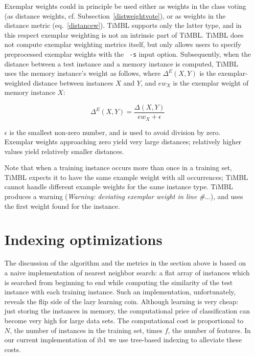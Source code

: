 \documentclass{report}
\begin{document}
Exemplar weights could in principle be used either as weights in the
class voting (as distance weights,
cf. Subsection~\ref{distweightvote}), or as weights in the distance
metric (eq.~\ref{distancew}). TiMBL supports only the latter type, and
in this respect exemplar weighting is not an intrinsic part of
TiMBL. TiMBL does not compute exemplar weighting metrics itself, but only
allows users to specify preprocessed exemplar weights with the {\tt
-s} input option. Subsequently, when the distance between a test
instance and a memory instance is computed, TiMBL uses the memory
instance's weight as follows, where $\Delta^{E}(X,Y)$ is the
exemplar-weighted distance between instances $X$ and $Y$, and $ew_{X}$
is the exemplar weight of memory instance $X$:

\begin{equation}
\Delta^{E}(X,Y) = \frac{\Delta(X,Y)}{ew_{X} + \epsilon}
\label{exweight}
\end{equation}

$\epsilon$ is the smallest non-zero number, and is used to avoid
division by zero. Exemplar weights approaching zero yield very large
distances; relatively higher values yield relatively smaller
distances.

Note that when a training instance occurs more than once in a training
set, TiMBL expects it to have the same example weight with all
occurrences; TiMBL cannot handle different example weights for the
same instance type. TiMBL produces a warning ({\em Warning: deviating
  exemplar weight in line \#$\ldots$}), and uses the first weight found for
the instance.

\section{Indexing optimizations}
\label{indexing}

The discussion of the algorithm and the metrics in the section above
is based on a naive implementation of nearest neighbor search: a flat
array of instances which is searched from beginning to end while
computing the similarity of the test instance with each training
instance. Such an implementation, unfortunately, reveals the flip side
of the lazy learning coin. Although learning is very cheap: just
storing the instances in memory, the computational price of
classification can become very high for large data sets. The
computational cost is proportional to $N$, the number of instances in
the training set, times $f$, the number of features. In our current
implementation of {\sc ib1} we use tree-based indexing to alleviate
these costs.
\end{document}
